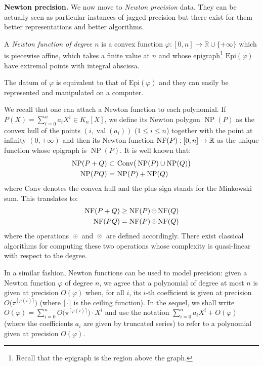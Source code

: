\documentclass{sig-alternate-05-2015}
\DeclareMathOperator{\NP}{NP}
\DeclareMathOperator{\val}{val}
\newcommand{\R}{\mathbb R}
\newcommand{\NF}{\text{\rm NF}}
\newcommand{\nfop}[1]{%
\raisebox{-0.1mm}{\begin{tikzpicture}
\draw[transparent] (-0.18,0)--(0.18,0);
\draw[very thin] (0,0) circle (0.11cm);
\begin{scope}
\clip (0,0) circle (0.11cm);
\node[scale=0.75] at (0,0) { $#1$ };
\end{scope}
\end{tikzpicture}}}
\newcommand{\nfplus}{\nfop+}
\newcommand{\nftimes}{\nfop\times}
\newcommand{\Epi}{\textrm{Epi}}
\begin{document}
\medskip

\noindent
{\bf Newton precision.} 
We now move to \emph{Newton precision} data. They can be actually seen 
as particular instances of jagged precision but there exist for them 
better representations and better algorithms.

\begin{deftn}
A \emph{Newton function of degree $n$} is a convex function 
$\varphi : [0,n] \to \R \cup \{+\infty\}$ which is piecewise affine, 
which takes a finite value at $n$ and whose epigraph\footnote{Recall
that the epigraph is the region above the graph.} $\Epi(\varphi)$ 
have extremal points with integral abscissa.
\end{deftn}

\begin{rem}
The datum of $\varphi$ is equivalent to that of $\Epi(\varphi)$ and they 
can easily be represented and manipulated on a computer.
\end{rem}

We recall that one can attach a Newton function to each polynomial.
If $P(X) = \sum_{i=0}^n a_i X^i \in K_n[X]$, we define its Newton
polygon $\NP(P)$ as the convex hull of the points $(i,\val(a_i))$ 
($1 \leq i \leq n$) together with the point at infinity $(0,+\infty)$
and then its Newton function $\NF(P) : [0,n] \to \R$ as the unique
function whose epigraph is $\NP(P)$. It is well known \cite[Section~1.6]{dwork-geratto-sullivan:Gfunctions} that:
$$\begin{array}{r@{\,\,}c@{\,\,}l}
\NP(P+Q) & \subset & \text{Conv}\big(\NP(P) \cup \NP(Q)\big) \smallskip \\
\NP(PQ) & = & \NP(P) + \NP(Q)
\end{array}$$
where $\text{Conv}$ denotes the convex hull and the plus sign stands 
for the Minkowski sum. This translates to:
$$\begin{array}{r@{\,\,}c@{\,\,}l}
\NF(P+Q) \geq \NF(P) \nfplus \NF(Q) \smallskip \\
\NF(PQ) = \NF(P) \nftimes \NF(Q)
\end{array}$$
where the operations $\nfplus$ and $\nftimes$ are defined accordingly.
There exist classical algorithms for computing these two operations
whose complexity is quasi-linear with respect to the degree.

In a similar fashion, Newton functions can be used to model precision: 
given a Newton function $\varphi$ of degree $n$, we agree that a polynomial 
of degree at most $n$ is given at precision $O(\varphi)$ when, for all $i$,
its $i$-th coefficient is given at precision $O\big(\pi^{\lceil \varphi(i)
\rceil}\big)$ (where $\lceil \cdot \rceil$ is the ceiling function).
In the sequel, we shall write
$O(\varphi) = \sum_{i=0}^n O\big(\pi^{\lceil \varphi(i) \rceil}\big) \cdot X^i$
and use the notation $\sum_{i=0}^n a_i X^i + O(\varphi)$ (where the
coefficients $a_i$ are given by truncated series) to refer to a 
polynomial given at precision $O(\varphi)$.
\end{document}
